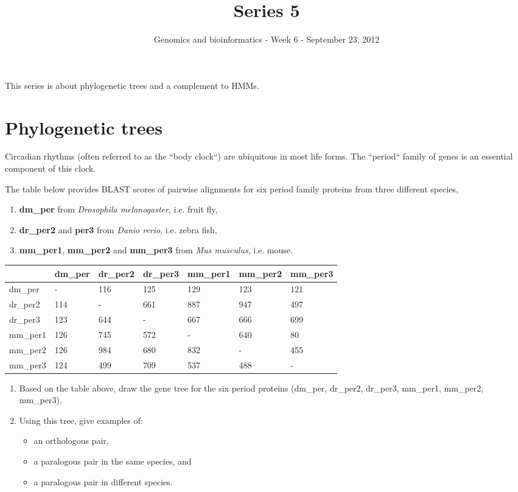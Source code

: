 \documentclass[a4paper,11pt]{article}
\title{Series 5}
\date{}
\author{Genomics and bioinformatics - Week 6 - September 23, 2012}
\begin{document}
\maketitle

This series is about phylogenetic trees and a complement to HMMs.

\section{Phylogenetic trees}

Circadian rhythms (often referred to as the ``body clock``) are
ubiquitous in most life forms. The ``period`` family of genes is an 
essential component of this clock.

The table below provides BLAST scores of pairwise
alignments for six period family proteins from three different
species, 

\begin{enumerate}
\item {\bf dm\_per} from {\it Drosophila melanogaster}, i.e. fruit fly,
\item {\bf dr\_per2} and {\bf per3} from {\it Danio rerio}, i.e. zebra fish,
\item {\bf mm\_per1}, {\bf mm\_per2} and {\bf mm\_per3} from {\it Mus
  musculus}, i.e. mouse.
\end{enumerate}

\begin{center}
	\begin{tabular} {| l || l | l | l | l | l | l |}
	\hline
 	& dm\_per & dr\_per2 & dr\_per3 & mm\_per1 & mm\_per2 & mm\_per3 \\ \hline\hline
	dm\_per & -  & 116 & 125 & 129 & 123 & 121 \\	\hline
	dr\_per2 &	114 & - & 661 & 887 & 947& 497 \\	\hline
	dr\_per3 & 123 & 644 & - & 667 & 666 & 699 \\	\hline
	mm\_per1 & 126 & 745 & 572 & - & 640 & 80 \\	\hline
	mm\_per2 & 126 & 984 & 680 & 832 & - & 455 \\	\hline
	mm\_per3 & 124 & 499 & 709 & 537 & 488 & - \\
	\hline
	\end{tabular}
\end{center}
\vspace{0.05 cm}

\begin{enumerate}
\item Based on the table above, draw the gene tree for the six period
  proteins (dm\_per, dr\_per2, dr\_per3,  mm\_per1, mm\_per2,
  mm\_per3). 
\item Using this tree, give examples of:
  \begin{itemize} 
  \item an orthologous pair, 
  \item a paralogous pair in the same species, and 
  \item a paralogous pair in different species.
  \end{itemize}
\end{enumerate}
\end{document}
